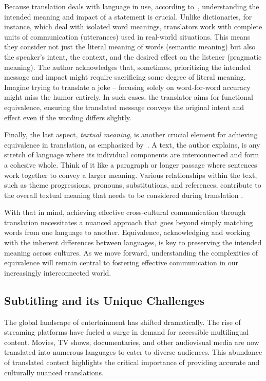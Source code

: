 Because translation deals with language in use, according to~\textcite[22]{house2014translation}, understanding the intended meaning and impact of a statement is crucial. Unlike dictionaries, for instance, which deal with isolated word meanings, translators work with complete units of communication (utterances) used in real-world situations. This means they consider not just the literal meaning of words (semantic meaning) but also the speaker's intent, the context, and the desired effect on the listener (pragmatic meaning). The author acknowledges that, sometimes, prioritizing the intended message and impact might require sacrificing some degree of literal meaning. Imagine trying to translate a joke – focusing solely on word-for-word accuracy might miss the humor entirely. In such cases, the translator aims for functional equivalence, ensuring the translated message conveys the original intent and effect even if the wording differs slightly.

Finally, the last aspect, \textit{textual meaning}, is another crucial element for achieving equivalence in translation, as emphasized by~\textcite[22-23]{house2014translation}. A text, the author explains, is any stretch of language where its individual components are interconnected and form a cohesive whole. Think of it like a paragraph or longer passage where sentences work together to convey a larger meaning. Various relationships within the text, such as theme progressions, pronouns, substitutions, and references, contribute to the overall textual meaning that needs to be considered during translation \parencite{house2014translation}.

With that in mind, achieving effective cross-cultural communication through translation necessitates a nuanced approach that goes beyond simply matching words from one language to another. Equivalence, acknowledging and working with the inherent differences between languages, is key to preserving the intended meaning across cultures. As we move forward, understanding the complexities of equivalence will remain central to fostering effective communication in our increasingly interconnected world.


\subsection{Subtitling and its Unique Challenges}

The global landscape of entertainment has shifted dramatically. The rise of streaming platforms have fueled a surge in demand for accessible multilingual content. Movies, TV shows, documentaries, and other audiovisual media are now translated into numerous languages to cater to diverse audiences. This abundance of translated content highlights the critical importance of providing accurate and culturally nuanced translations.

